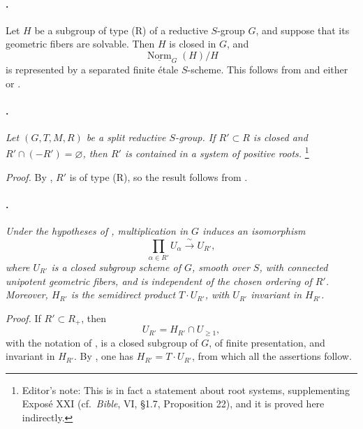 \paragraph{.}
Let \(H\) be a subgroup of type \textup{(R)} of a reductive
\(S\)-group \(G\), and suppose that its geometric fibers are
solvable. Then \(H\) is closed in \(G\), and
\[
  \underline{\operatorname{Norm}}_G(H)/H
\]
is represented by a separated finite étale \(S\)-scheme. This
follows from  and either  or \textup{}.

\paragraph{.}
\textit{Let \((G,T,M,R)\) be a split reductive \(S\)-group. If
\(R'\subset R\) is closed and \(R'\cap(-R')=\varnothing\), then
\(R'\) is contained in a system of positive roots.}
\footnote{Editor's note: This is in fact a statement about root
systems, supplementing Exposé XXI \textup{(cf.\ \emph{Bible},
VI, \S1.7, Proposition 22)}, and it is proved here indirectly.}

\textit{Proof.}
By , \(R'\) is of type \textup{(R)}, so the result follows from
.

\paragraph{.}
\textit{Under the hypotheses of , multiplication
in \(G\) induces an isomorphism}
\[
  \prod_{\alpha\in R'}U_\alpha
  \xrightarrow{\ \sim\ } U_{R'},
\]
\textit{where \(U_{R'}\) is a closed subgroup scheme of \(G\),
smooth over \(S\), with connected unipotent geometric fibers, and is
independent of the chosen ordering of \(R'\). Moreover, \(H_{R'}\)
is the semidirect product \(T\cdot U_{R'}\), with \(U_{R'}\)
invariant in \(H_{R'}\).}

\textit{Proof.}
If \(R'\subset R_+\), then
\[
  U_{R'}=H_{R'}\cap U_{\geq1},
\]
with the notation of , is a closed subgroup of \(G\), of finite
presentation, and invariant in \(H_{R'}\). By \textup{}, one has \(H_{R'}=T\cdot U_{R'}\), from which all
the assertions follow.

